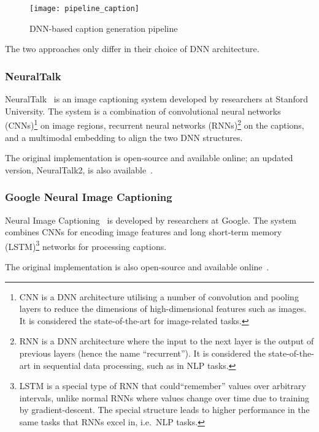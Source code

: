\begin{figure}[ht]
\begin{center}
    \texttt{[image: pipeline\_caption]}
    \caption{DNN-based caption generation pipeline}\label{dnn-cap}
\end{center}
\end{figure}

The two approaches only differ in their choice of DNN architecture.

\subsubsection{NeuralTalk}

NeuralTalk~\cite{nrtalk} is an image captioning system developed by researchers
at Stanford University. The system is a combination of convolutional neural
networks (CNNs)\footnote{CNN is a DNN architecture utilising a number of
convolution and pooling layers to reduce the dimensions of high-dimensional
features such as images. It is considered the state-of-the-art for image-related
tasks.} on image regions, recurrent neural networks (RNNs)\footnote{RNN is a DNN
architecture where the input to the next layer is the output of previous layers
(hence the name ``recurrent''). It is considered the state-of-the-art in
sequential data processing, such as in NLP tasks.} on the captions, and a
multimodal embedding to align the two DNN structures.

The original implementation is open-source and available online; an updated
version, NeuralTalk2, is also available~\cite{gh-nrtalk,gh-nrtalk2}.

\subsubsection{Google Neural Image Captioning}

Neural Image Captioning~\cite{google-img} is developed by researchers at Google.
The system combines CNNs for encoding image features and long short-term memory
(LSTM)\footnote{LSTM is a special type of RNN that could``remember'' values over
arbitrary intervals, unlike normal RNNs where values change over time due to
training by gradient-descent. The special structure leads to higher performance
in the same tasks that RNNs excel in, i.e.\ NLP tasks.} networks for processing
captions.

The original implementation is also open-source and available
online~\cite{gh-google-img}.


